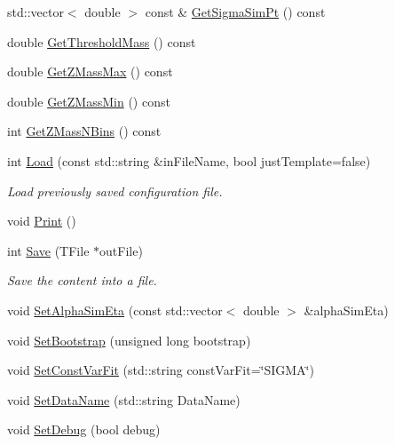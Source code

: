 \begin{DoxyCompactItemize}
std\+::vector$<$ double $>$ const \& \hyperlink{classTemplateMethod_1_1Setting_aed6de428463c64e9bc8da38aad551662}{Get\+Sigma\+Sim\+Pt} () const 
\item 
double \hyperlink{classTemplateMethod_1_1Setting_aa364ca7673b2103538727eee8c4b12f9}{Get\+Threshold\+Mass} () const 
\item 
double \hyperlink{classTemplateMethod_1_1Setting_a6e2dbc5897658d6208b185d0b3f5481b}{Get\+Z\+Mass\+Max} () const 
\item 
double \hyperlink{classTemplateMethod_1_1Setting_ac2d44463362c73924e2b31cbcf9bb79e}{Get\+Z\+Mass\+Min} () const 
\item 
int \hyperlink{classTemplateMethod_1_1Setting_a975d52e247db87e13ff7c41a6b6763b3}{Get\+Z\+Mass\+N\+Bins} () const 
\item 
int \hyperlink{classTemplateMethod_1_1Setting_a3fba1d3b893a954cbfd0c2ab0482564e}{Load} (const std\+::string \&in\+File\+Name, bool just\+Template=false)
\begin{DoxyCompactList}\small\item\em Load previously saved configuration file. \end{DoxyCompactList}\item 
void \hyperlink{classTemplateMethod_1_1Setting_a9dcac18006ce057b8d78c847174c1362}{Print} ()
\item 
int \hyperlink{classTemplateMethod_1_1Setting_a3c86a9020f99ea422d42025c5d1c9c92}{Save} (T\+File $\ast$out\+File)
\begin{DoxyCompactList}\small\item\em Save the content into a file. \end{DoxyCompactList}\item 
void \hyperlink{classTemplateMethod_1_1Setting_ab452286ea73fb313805700e47e027b67}{Set\+Alpha\+Sim\+Eta} (const std\+::vector$<$ double $>$ \&alpha\+Sim\+Eta)
\item 
void \hyperlink{classTemplateMethod_1_1Setting_adcccf57a0047d9f041b2f1c7aeee3f08}{Set\+Bootstrap} (unsigned long bootstrap)
\item 
void \hyperlink{classTemplateMethod_1_1Setting_aca9eee1922355db36745afd7078d3db7}{Set\+Const\+Var\+Fit} (std\+::string const\+Var\+Fit=\char`\"{}S\+I\+G\+M\+A\char`\"{})
\item 
void \hyperlink{classTemplateMethod_1_1Setting_a59caf2961470fceeb4fa500888f66190}{Set\+Data\+Name} (std\+::string Data\+Name)
\item 
void \hyperlink{classTemplateMethod_1_1Setting_af78502153c8574f988e42e34f552fa40}{Set\+Debug} (bool debug)

\end{DoxyCompactItemize}
